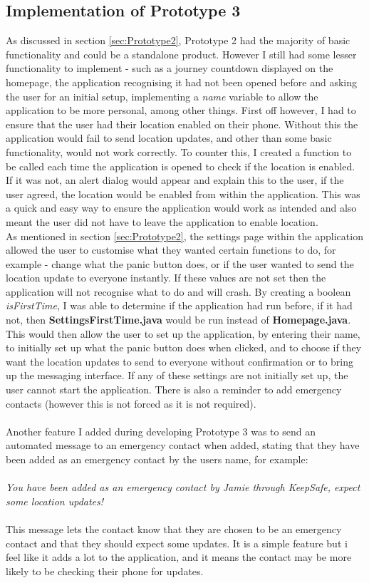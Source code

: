 \documentclass[a4paper]{report}
\begin{document}
\subsection{Implementation of Prototype 3} 
\label{sec:ImpPrototype3}
As discussed in section \ref{sec:Prototype2}, Prototype 2 had the majority of basic functionality and could be a standalone product. However I still had some lesser functionality to implement - such as a journey countdown displayed on the homepage, the application recognising it had not been opened before and asking the user for an initial setup, implementing a \textit{name} variable to allow the application to be more personal, among other things. First off however, I had to ensure that the user had their location enabled on their phone. Without this the application would fail to send location updates, and other than some basic functionality, would not work correctly. To counter this, I created a function to be called each time the application is opened to check if the location is enabled. If it was not, an alert dialog would appear and explain this to the user, if the user agreed, the location would be enabled from within the application. This was a quick and easy way to ensure the application would work as intended and also meant the user did not have to leave the application to enable location.\\  As mentioned in section \ref{sec:Prototype2}, the settings page within the application allowed the user to customise what they wanted certain functions to do, for example - change what the panic button does, or if the user wanted to send the location update to everyone instantly. If these values are not set then the application will not recognise what to do and will crash. By creating a boolean \textit{isFirstTime}, I was able to determine if the application had run before, if it had not, then \textbf{SettingsFirstTime.java} would be run instead of \textbf{Homepage.java}. This would then allow the user to set up the application, by entering their name, to initially set up what the panic button does when clicked, and to choose if they want the location updates to send to everyone without confirmation or to bring up the messaging interface. If any of these settings are not initially set up, the user cannot start the application. There is also a reminder to add emergency contacts (however this is not forced as it is not required). 
\\\\Another feature I added during developing Prototype 3 was to send an automated message to an emergency contact when added, stating that they have been added as an emergency contact by the users name, for example: \\\\
\textit{You have been added as an emergency contact by Jamie through KeepSafe, expect some location updates!} \\\\
This message lets the contact know that they are chosen to be an emergency contact and that they should expect some updates. It is a simple feature but i feel like it adds a lot to the application, and it means the contact may be more likely to be checking their phone for updates. 
\end{document}
